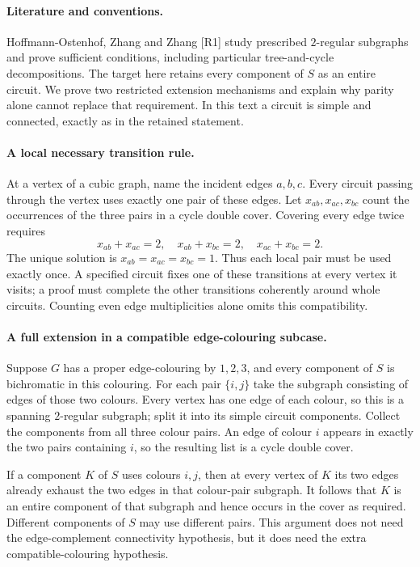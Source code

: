 \documentclass[11pt,a4paper]{article}
\begin{document}
\paragraph{Literature and conventions.}
Hoffmann-Ostenhof, Zhang and Zhang [R1] study prescribed $2$-regular
subgraphs and prove sufficient conditions, including particular
tree-and-cycle decompositions. The target here retains every
component of $S$ as an entire circuit. We prove two restricted
extension mechanisms and explain why parity alone cannot replace
that requirement. In this text a circuit is simple and connected,
exactly as in the retained statement.

\paragraph{A local necessary transition rule.}
At a vertex of a cubic graph, name the incident edges $a,b,c$.
Every circuit passing through the vertex uses exactly one pair
of these edges. Let $x_{ab},x_{ac},x_{bc}$ count the occurrences
of the three pairs in a cycle double cover. Covering every edge
twice requires
\[
 x_{ab}+x_{ac}=2,\quad x_{ab}+x_{bc}=2,\quad x_{ac}+x_{bc}=2.
\]
The unique solution is $x_{ab}=x_{ac}=x_{bc}=1$. Thus each local
pair must be used exactly once. A specified circuit fixes one
of these transitions at every vertex it visits; a proof must
complete the other transitions coherently around whole circuits.
Counting even edge multiplicities alone omits this compatibility.

\paragraph{A full extension in a compatible edge-colouring subcase.}
Suppose $G$ has a proper edge-colouring by $1,2,3$, and every
component of $S$ is bichromatic in this colouring. For each pair
$\{i,j\}$ take the subgraph consisting of edges of those two
colours. Every vertex has one edge of each colour, so this is
a spanning $2$-regular subgraph; split it into its simple circuit
components. Collect the components from all three colour pairs.
An edge of colour $i$ appears in exactly the two pairs containing
$i$, so the resulting list is a cycle double cover.

If a component $K$ of $S$ uses colours $i,j$, then at every vertex
of $K$ its two edges already exhaust the two edges in that
colour-pair subgraph. It follows that $K$ is an entire component
of that subgraph and hence occurs in the cover as required.
Different components of $S$ may use different pairs. This argument
does not need the edge-complement connectivity hypothesis, but it
does need the extra compatible-colouring hypothesis.
\end{document}
